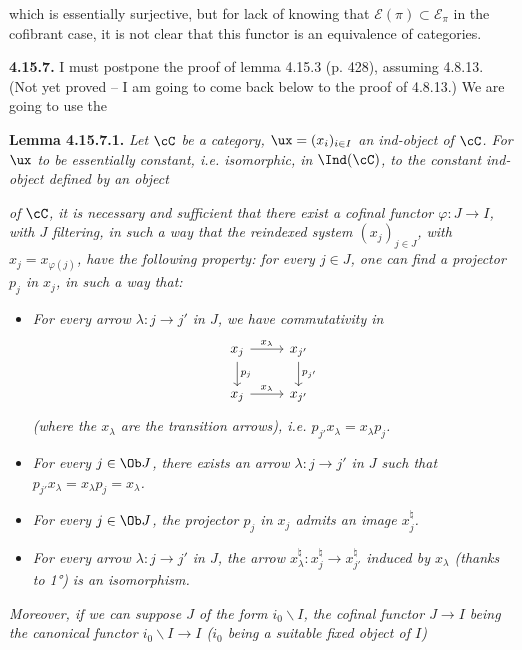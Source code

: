 \setcounter{footnote}{183}

which is essentially surjective, but for lack of knowing that $\mathcal{E}(\pi) \subset \mathcal{E}_\pi$ in the cofibrant case, it is not clear that this functor is an equivalence of categories.

\textbf{4.15.7.} I must postpone the proof of lemma 4.15.3 (p. 428), assuming 4.8.13. (Not yet proved -- I am going to come back below to the proof of 4.8.13.) We are going to use the

\textbf{Lemma 4.15.7.1.} \textit{Let $\cC$ be a category, $\ux = (x_i)_{i\in I}$ an ind-object of $\cC$. For $\ux$ to be essentially constant, i.e. isomorphic, in} $\Ind(\cC)$\textit{, to the constant ind-object defined by an object}

\textit{of $\cC$, it is necessary and sufficient that there exist a cofinal functor $\varphi : J \longrightarrow I$, with $J$ filtering, in such a way that the reindexed system $(x_j)_{j\in J}$, with $x_j = x_{\varphi(j)}$, have the following property: for every $j \in J$, one can find a projector $p_j$ in $x_j$, in such a way that:}
\begin{itemize}
\item[\textit{1°)}] \textit{For every arrow $\lambda : j \longrightarrow j'$ in $J$, we have commutativity in}
\[
\begin{tikzcd}
x_j \arrow[r, "x_\lambda"] \arrow[d, "p_j"] & x_{j'} \arrow[d, "p_{j'}"] \\
x_j \arrow[r, "x_\lambda"] & x_{j'}
\end{tikzcd}
\]
\textit{(where the $x_\lambda$ are the transition arrows), i.e. $p_{j'}x_\lambda = x_\lambda p_j$.}
\item[\textit{2°)}] \textit{For every $j \in \Ob J$, there exists an arrow $\lambda : j \longrightarrow j'$ in $J$ such that $p_{j'}x_\lambda = x_\lambda p_j = x_\lambda$.}
\item[\textit{3°)}] \textit{For every $j \in \Ob J$, the projector $p_j$ in $x_j$ admits an image $x_j^\natural$.} %
\item[\textit{4°)}] \textit{For every arrow $\lambda : j \longrightarrow j'$ in $J$, the arrow $x_\lambda^\natural : x_j^\natural \longrightarrow x_{j'}^\natural$ induced by $x_\lambda$ (thanks to 1°) is an isomorphism.}
\end{itemize}
\textit{Moreover, if we can suppose $J$ of the form $i_0\backslash I$, the cofinal functor $J \longrightarrow I$ being the canonical functor $i_0\backslash I \longrightarrow I$ ($i_0$ being a suitable fixed object of $I$)} 

